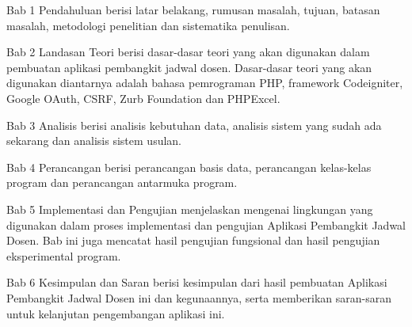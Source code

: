 Bab 1 Pendahuluan berisi latar belakang, rumusan masalah, tujuan, batasan masalah,  metodologi penelitian dan sistematika penulisan.

Bab 2 Landasan Teori berisi dasar-dasar teori yang akan digunakan dalam pembuatan aplikasi pembangkit jadwal dosen. Dasar-dasar teori yang akan digunakan diantarnya adalah bahasa pemrograman PHP, framework Codeigniter, Google OAuth, CSRF, Zurb Foundation dan PHPExcel.

Bab 3 Analisis berisi analisis kebutuhan data, analisis sistem yang sudah ada sekarang dan analisis sistem usulan.

Bab 4 Perancangan berisi perancangan basis data, perancangan kelas-kelas program dan perancangan antarmuka program.

Bab 5 Implementasi dan Pengujian menjelaskan mengenai lingkungan yang digunakan dalam proses implementasi dan pengujian Aplikasi Pembangkit Jadwal Dosen. Bab ini juga mencatat hasil pengujian fungsional dan hasil pengujian eksperimental program.

Bab 6 Kesimpulan dan Saran berisi kesimpulan dari hasil pembuatan Aplikasi Pembangkit Jadwal Dosen ini dan kegunaannya, serta memberikan saran-saran untuk kelanjutan pengembangan aplikasi ini.
